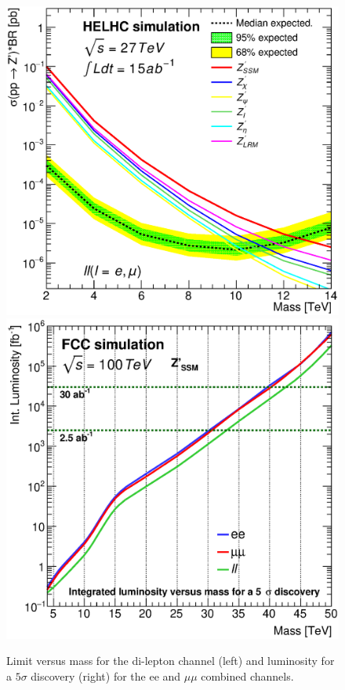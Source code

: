 \begin{figure}[!htb]
  \centering
  \includegraphics[width=0.45\columnwidth]{Fig/lim_Zprime_ll_helhc_v01_allxs.eps}
  \includegraphics[width=0.45\columnwidth]{Fig/DiscoveryPotential_ll_comb_rootStyle.eps}
  \caption{Limit versus mass for the di-lepton channel (left) and luminosity for a $5\sigma$ discovery (right) for the ee and $\mu\mu$ combined channels. }
  \label{figure:lepana:limdisc}
\end{figure}


\label{subsubsection:vardef}


